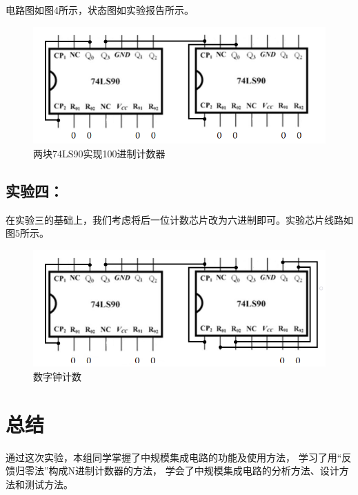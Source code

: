 \documentclass[a4paper,11pt,UTF8]{ctexart}
\begin{document}
 电路图如图4所示，状态图如实验报告所示。
 \begin{figure}[H]
  \centering
  \includegraphics[width=14cm]{jsq4}
  \caption{两块74LS90实现100进制计数器}
  \label{fig:jsq4}
 \end{figure}

 \subsection{实验四：\expd}
 在实验三的基础上，我们考虑将后一位计数芯片改为六进制即可。实验芯片线路如图5所示。
 \begin{figure}[H]
  \centering
  \includegraphics[width=14cm]{jsq5}
  \caption{数字钟计数}
  \label{fig:jsq5}
 \end{figure}








  


  
 

\section{总结}
通过这次实验，本组同学掌握了中规模集成电路的功能及使用方法，
学习了用“反馈归零法”构成N进制计数器的方法，
学会了中规模集成电路的分析方法、设计方法和测试方法。


 
\end{document}
